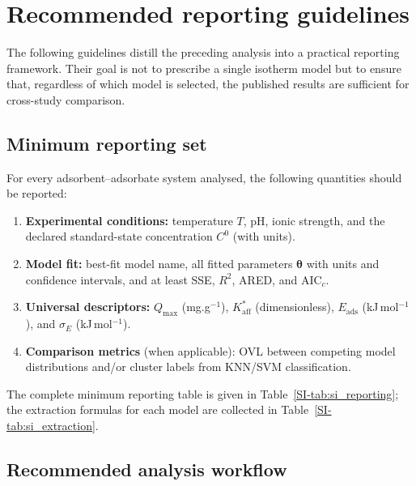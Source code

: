 \documentclass[journal=jacsat,manuscript=article]{achemso}
\begin{document}
	\section{Recommended reporting guidelines}
	\label{sec:guidelines}

	The following guidelines distill the preceding analysis into a practical reporting framework. Their goal is not to prescribe a single isotherm model but to ensure that, regardless of which model is selected, the published results are sufficient for cross-study comparison.

	\subsection{Minimum reporting set}
	\label{sec:min_reporting}

	For every adsorbent--adsorbate system analysed, the following quantities should be reported:
	\begin{enumerate}
		\item \textbf{Experimental conditions:} temperature $T$, pH, ionic strength, and the declared standard-state concentration $C^{0}$ (with units).
		\item \textbf{Model fit:} best-fit model name, all fitted parameters $\boldsymbol{\theta}$ with units and confidence intervals, and at least SSE, $R^2$, ARED, and AIC$_c$.
		\item \textbf{Universal descriptors:} $Q_{\max}$ (mg.g$^{-1}$), $K_{\mathrm{aff}}^{\ast}$ (dimensionless), $E_{\mathrm{ads}}$ (kJ\,mol$^{-1}$), and $\sigma_E$ (kJ\,mol$^{-1}$).
		\item \textbf{Comparison metrics} (when applicable): OVL between competing model distributions and/or cluster labels from KNN/SVM classification.
	\end{enumerate}
	The complete minimum reporting table is given in Table~\ref{SI-tab:si_reporting}; the extraction formulas for each model are collected in Table~\ref{SI-tab:si_extraction}.

	\subsection{Recommended analysis workflow}
	\label{sec:workflow}
\end{document}
